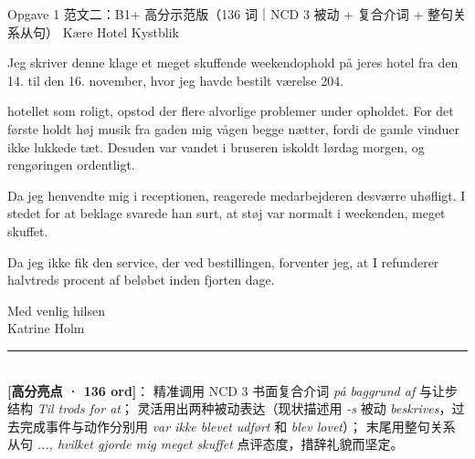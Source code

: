 \begin{emailbox}{Opgave 1 范文二：B1+ 高分示范版（136 词｜NCD 3 被动 + 复合介词 + 整句关系从句）}
Kære Hotel Kystblik

Jeg skriver denne klage  et meget skuffende weekendophold på jeres hotel fra den 14. til den 16. november, hvor jeg havde bestilt værelse 204.

 hotellet  som roligt, opstod der flere alvorlige problemer under opholdet. For det første holdt høj musik fra gaden mig vågen begge nætter, fordi de gamle vinduer ikke lukkede tæt. Desuden var vandet i bruseren iskoldt lørdag morgen, og rengøringen  ordentligt.

Da jeg henvendte mig i receptionen, reagerede medarbejderen desværre uhøfligt. I stedet for at beklage svarede han surt, at støj var normalt i weekenden,  meget skuffet.

Da jeg ikke fik den service, der  ved bestillingen, forventer jeg, at I refunderer halvtreds procent af beløbet inden fjorten dage.

Med venlig hilsen\\
Katrine Holm

\vspace{0.3em}
\rule{\linewidth}{0.4pt}\\[0.2em]
\small\textbf{\color{NCDNavy}[高分亮点 · 136 ord]}： 精准调用 NCD 3 书面复合介词 \textit{på baggrund af} 与让步结构 \textit{Til trods for at}； 灵活用出两种被动表达（现状描述用 \textit{-s} 被动 \textit{beskrives}，过去完成事件与动作分别用 \textit{var ikke blevet udført} 和 \textit{blev lovet}）； 末尾用整句关系从句 \textit{..., hvilket gjorde mig meget skuffet} 点评态度，措辞礼貌而坚定。
\end{emailbox}


